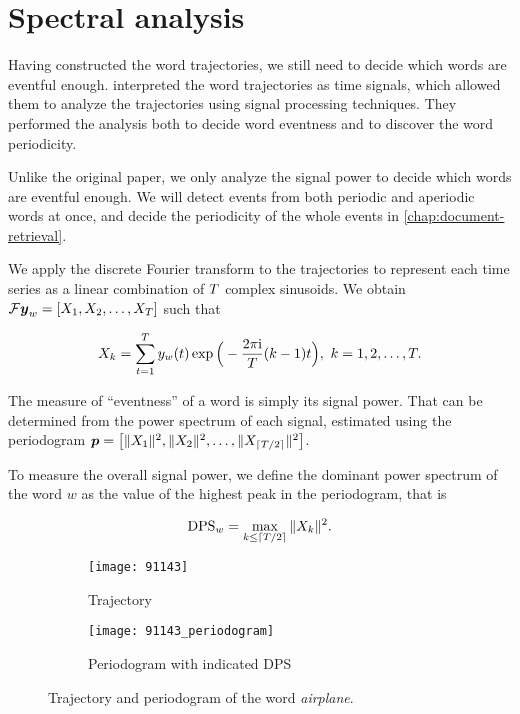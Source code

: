 \section{Spectral analysis}
Having constructed the word trajectories, we still need to decide which words are eventful enough. \cite{event-detection} interpreted the word trajectories as time signals, which allowed them to analyze the trajectories using signal processing techniques. They performed the analysis both to decide word eventness and to discover the word periodicity.

Unlike the original paper, we only analyze the signal power to decide which words are eventful enough. We will detect events from both periodic and aperiodic words at once, and decide the periodicity of the whole events in \autoref{chap:document-retrieval}.

We apply the discrete Fourier transform to the trajectories to represent each time series as a linear combination of $T$ complex sinusoids. We obtain $\mathcal{F} \vect{\traj}_{w} = \left[ X_{1}, X_{2}, \dots, X_{\streamlen}\right ]$ such that

\begin{equation}
	X_{k} = \sum_{t = 1}^{T}{y_{w}(t) \exp \Big(- \frac{2 \pi \mathrm{i}}{T} (k - 1) t} \Big), ~ k = 1, 2, \dots, T.
\end{equation}

The measure of ``eventness'' of a word is simply its signal power. That can be determined from the power spectrum of each signal, estimated using the periodogram $\vect{P} = \left[ \|X_{1}\|^{2}, \|X_{2}\|^{2}, \dots, \|X_{\ceil{\streamlen / 2}}\|^{2} \right]$.

To measure the overall signal power, we define the dominant power spectrum of the word $w$ as the value of the highest peak in the periodogram, that is

\begin{equation}
	\text{DPS}_{w} = \max\limits_{k \leq \lceil T / 2\rceil}{\|X_{k}\|^{2}}.
\end{equation}


\begin{figure}[H]
\centering
\begin{subfigure}{.5\textwidth}
  \centering
  \texttt{[image: 91143]}  %
  \caption{Trajectory}
  \label{fig:letadlo}
\end{subfigure}%
\begin{subfigure}{.5\textwidth}
  \centering
  \texttt{[image: 91143\_periodogram]}  %
  \caption{Periodogram with indicated DPS}
  \label{fig:letadlo-periodogram}
\end{subfigure}
\caption{Trajectory and periodogram of the word \textit{airplane}.}
\end{figure}

